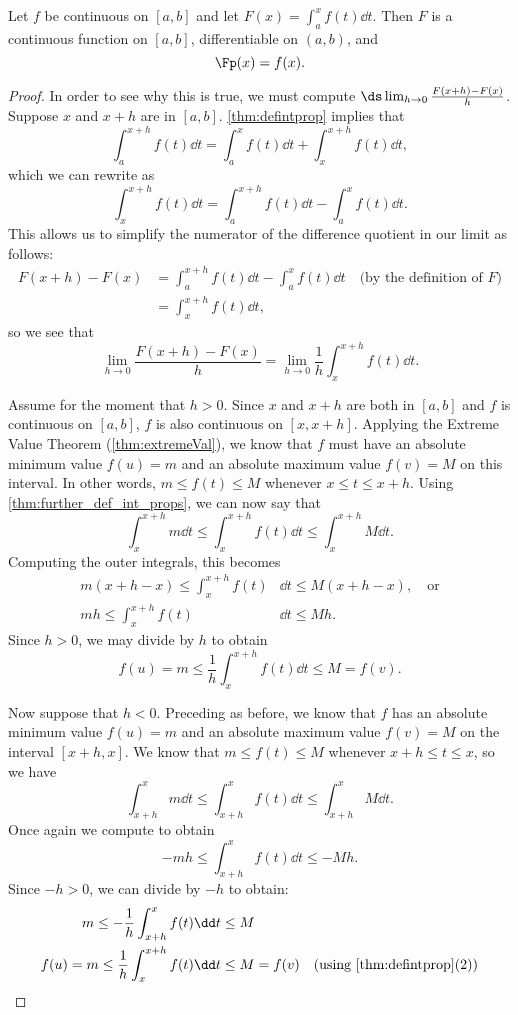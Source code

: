 \begin{theorem}\label{thm:FTC1}%
Let $f$ be continuous on $[a,b]$ and let $F(x) = \int_a^x f(t)\dd t$. Then $F$ is a continuous function on $[a,b]$, differentiable on $(a,b)$, and
\[\Fp(x)=f(x).\]
\end{theorem}

\begin{proof}
In order to see why this is true, we must compute $\ds\lim_{h\to 0}\frac{F(x+h)-F(x)}{h}$. Suppose $x$ and $x+h$ are in $[a,b]$. \autoref{thm:defintprop} implies that
\[\int_a^{x+h}f(t)\dd t =\int_a^x f(t)\dd t+\int_x^{x+h} f(t)\dd t,\]
which we can rewrite as
\[\int_x^{x+h} f(t)\dd t=\int_a^{x+h} f(t)\dd t-\int_a^x f(t)\dd t.\]
This allows us to simplify the numerator of the difference quotient in our limit as follows:
\begin{align*}
F(x+h)-F(x)
&=\int_a^{x+h} f(t)\dd t-\int_a^x f(t)\dd t \quad\text{(by the definition of $F$)}\\
&=\int_x^{x+h} f(t)\dd t,
\end{align*}
so we see that
\[\lim_{h\to 0}\frac{F(x+h)-F(x)}{h}=\lim_{h\to 0}\frac 1h\int_x^{x+h} f(t)\dd t.\]

Assume for the moment that $h>0$. Since $x$ and $x+h$ are both in $[a,b]$ and $f$ is continuous on $[a,b]$, $f$ is also continuous on $[x,x+h]$. Applying the Extreme Value Theorem (\autoref{thm:extremeVal}), we know that $f$ must have an absolute minimum value $f(u)=m$ and an absolute maximum value $f(v)=M$ on this interval. In other words, $m\leq f(t)\leq M$ whenever $x\leq t\leq x+h$. Using \autoref{thm:further_def_int_props},
we can now say that
\[\int_x^{x+h} m\dd t \leq \int_x^{x+h} f(t)\dd t \leq \int_x^{x+h} M\dd t.\]
Computing the outer integrals, this becomes 
\begin{align*}
m(x+h-x)\leq \int_x^{x+h} f(t)&\dd t \leq M(x+h-x),\quad\text{or}\\
mh\leq \int_x^{x+h} f(t)&\dd t \leq Mh.
\end{align*}
Since $h>0$, we may divide by $h$ to obtain
\[f(u)=m\leq \frac1h\int_x^{x+h} f(t)\dd t \leq M=f(v).\]

Now suppose that $h<0$. Preceding as before, we know that $f$ has an absolute minimum value $f(u)=m$ and an absolute maximum value $f(v)=M$ on the interval $[x+h,x]$. We know that $m\leq f(t)\leq M$ whenever $x+h\leq t\leq x$, so we have
\[\int_{x+h}^x m\dd t\leq\int_{x+h}^x f(t)\dd t\leq \int_{x+h}^x M\dd t.\]
Once again we compute to obtain
\[ -mh\leq \int_{x+h}^x f(t)\dd t \leq -Mh.\]
Since $-h>0$, we can divide by $-h$ to obtain:
\begin{align*}
m\leq -\frac1h\int_{x+h}^x f(t)&\dd t \leq M\\
f(u)=m\leq \frac1h \int_x^{x+h} f(t)&\dd t \leq M=f(v)
\quad\text{(using \autoref{thm:defintprop}(2))}\\
\end{align*}


\end{proof}
